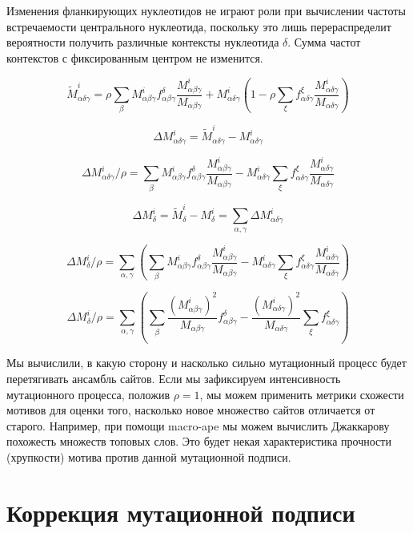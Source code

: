 \documentclass[a4paper]{article}
\begin{document}
Изменения фланкирующих нуклеотидов не играют роли при вычислении частоты встречаемости центрального нуклеотида, поскольку это лишь перераспределит вероятности получить различные контексты нуклеотида $\delta$. Сумма частот контекстов с фиксированным центром не изменится.

$$\widetilde{M}^i_{\alpha\delta\gamma} = \rho\sum_{\beta}M^i_{\alpha\beta\gamma}f_{\alpha\beta\gamma}^{\delta}\frac{M^i_{\alpha\beta\gamma}}{M_{\alpha\beta\gamma}} + M^i_{\alpha\delta\gamma}\left(1 - \rho\sum_{\xi}f_{\alpha\delta\gamma}^{\xi}\frac{M^i_{\alpha\delta\gamma}}{M_{\alpha\delta\gamma}}\right)$$

$$\Delta M^i_{\alpha\delta\gamma} = \widetilde{M}^i_{\alpha\delta\gamma} - M^i_{\alpha\delta\gamma}$$

$$\Delta M^i_{\alpha\delta\gamma}/\rho = \sum_{\beta}M^i_{\alpha\beta\gamma}f_{\alpha\beta\gamma}^{\delta}\frac{M^i_{\alpha\beta\gamma}}{M_{\alpha\beta\gamma}} - M^i_{\alpha\delta\gamma}\sum_{\xi}f_{\alpha\delta\gamma}^{\xi}\frac{M^i_{\alpha\delta\gamma}}{M_{\alpha\delta\gamma}}$$

$$\Delta M^i_{\delta} = \widetilde{M}^i_{\delta} - M^i_{\delta} = \sum_{\alpha,\gamma}\Delta M^i_{\alpha\delta\gamma}$$

$$\Delta M^i_{\delta}/\rho = \sum_{\alpha,\gamma}\left(\sum_{\beta}M^i_{\alpha\beta\gamma}f_{\alpha\beta\gamma}^{\delta}\frac{M^i_{\alpha\beta\gamma}}{M_{\alpha\beta\gamma}} - M^i_{\alpha\delta\gamma}\sum_{\xi}f_{\alpha\delta\gamma}^{\xi}\frac{M^i_{\alpha\delta\gamma}}{M_{\alpha\delta\gamma}}\right)$$

$$\Delta M^i_{\delta}/\rho = \sum_{\alpha,\gamma}\left(\sum_{\beta}\frac{\left(M^i_{\alpha\beta\gamma}\right)^2}{M_{\alpha\beta\gamma}}f_{\alpha\beta\gamma}^{\delta} - \frac{\left(M^i_{\alpha\delta\gamma}\right)^2}{M_{\alpha\delta\gamma}}\sum_{\xi}f_{\alpha\delta\gamma}^{\xi}\right)$$


Мы вычислили, в какую сторону и насколько сильно мутационный процесс будет перетягивать ансамбль сайтов. Если мы зафиксируем интенсивность мутационного процесса, положив $\rho=1$, мы можем применить метрики схожести мотивов для оценки того, насколько новое множество сайтов отличается от старого. Например, при помощи macro-ape мы можем вычислить Джаккарову похожесть множеств топовых слов. Это будет некая характеристика прочности (хрупкости) мотива против данной мутационной подписи.

\section{Коррекция мутационной подписи}
\end{document}
